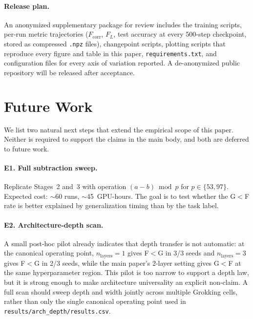 \documentclass{article}
\newcommand{\fcorr}{F_{\mathrm{corr}}}
\newcommand{\flogit}{F_{L}}
\begin{document}
\paragraph{Release plan.}
An anonymized supplementary package for review includes the
training scripts, per-run metric trajectories ($\fcorr$, $\flogit$,
test accuracy at every 500-step checkpoint, stored as compressed
\texttt{.npz} files), changepoint scripts, plotting scripts that
reproduce every figure and table in this paper,
\texttt{requirements.txt}, and configuration files for every axis
of variation reported.
A de-anonymized public repository will be released after
acceptance.

\section{Future Work}
\label{app:future_work}

We list two natural next steps that extend the empirical scope of
this paper. Neither is required to support the claims in the main
body, and both are deferred to future work.

\paragraph{E1. Full subtraction sweep.}
Replicate Stages~2 and~3 with operation $(a-b)\bmod p$ for
$p\in\{53,97\}$. Expected cost: $\sim$60 runs, $\sim$45~GPU-hours.
The goal is to test whether the G$<$F rate is better explained
by generalization timing than by the task label.

\paragraph{E2. Architecture-depth scan.}
A small post-hoc pilot already indicates that depth transfer is not
automatic: at the canonical operating point, $n_{\mathrm{layers}}=1$
gives F$<$G in 3/3 seeds and $n_{\mathrm{layers}}=3$ gives F$<$G in
2/3 seeds, while the main paper's 2-layer setting gives G$<$F at the
same hyperparameter region. This pilot is too narrow to support a
depth law, but it is strong enough to make architecture universality
an explicit non-claim. A full scan should sweep depth and width
jointly across multiple Grokking cells, rather than only the single
canonical operating point used in
\texttt{results/arch\_depth/results.csv}.


\end{document}
